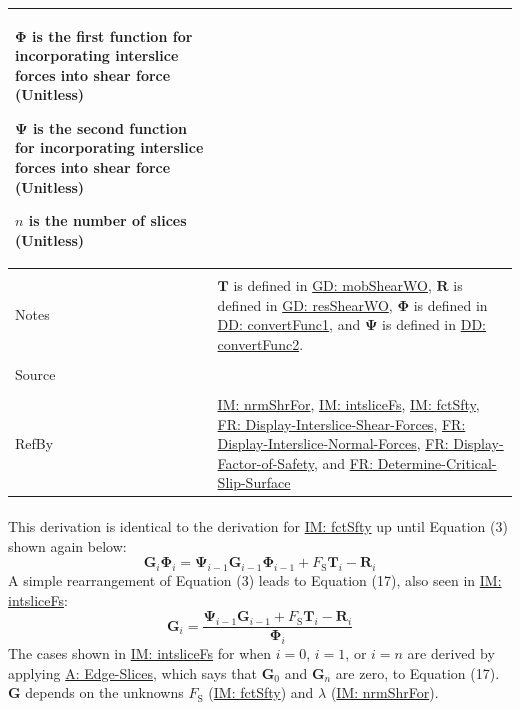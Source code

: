 \documentclass[12pt]{article}
\begin{document}
\begin{minipage}{\textwidth}
\begin{tabular}{>{\raggedright}p{}>{\raggedright\arraybackslash}p{}}
\begin{symbDescription}
              \item{$\mathbf{Φ}$ is the first function for incorporating interslice forces into shear force (Unitless)}
              \item{$\mathbf{Ψ}$ is the second function for incorporating interslice forces into shear force (Unitless)}
              \item{$n$ is the number of slices (Unitless)}
              \end{symbDescription}
\\ \midrule \\
Notes & $\mathbf{T}$ is defined in \hyperref[GD:mobShearWO]{GD: mobShearWO}, $\mathbf{R}$ is defined in \hyperref[GD:resShearWO]{GD: resShearWO}, $\mathbf{Φ}$ is defined in \hyperref[DD:convertFunc1]{DD: convertFunc1}, and $\mathbf{Ψ}$ is defined in \hyperref[DD:convertFunc2]{DD: convertFunc2}.
\\ \midrule \\
Source & \cite{chen2005}
\\ \midrule \\
RefBy & \hyperref[IM:nrmShrFor]{IM: nrmShrFor}, \hyperref[IM:intsliceFs]{IM: intsliceFs}, \hyperref[IM:fctSfty]{IM: fctSfty}, \hyperref[displayShear]{FR: Display-Interslice-Shear-Forces}, \hyperref[displayNormal]{FR: Display-Interslice-Normal-Forces}, \hyperref[displayFS]{FR: Display-Factor-of-Safety}, and \hyperref[determineCritSlip]{FR: Determine-Critical-Slip-Surface}
\\ \bottomrule
\end{tabular}
\end{minipage}
\paragraph{}
\label{IM:intsliceFsDeriv}
This derivation is identical to the derivation for \hyperref[IM:fctSfty]{IM: fctSfty} up until Equation (3) shown again below:
\begin{displaymath}
{\mathbf{G}}_{i} {\mathbf{Φ}}_{i}={\mathbf{Ψ}}_{i-1} {\mathbf{G}}_{i-1} {\mathbf{Φ}}_{i-1}+{F_{\text{S}}} {\mathbf{T}}_{i}-{\mathbf{R}}_{i}
\end{displaymath}
A simple rearrangement of Equation (3) leads to Equation (17), also seen in \hyperref[IM:intsliceFs]{IM: intsliceFs}:
\begin{displaymath}
{\mathbf{G}}_{i}=\frac{{\mathbf{Ψ}}_{i-1} {\mathbf{G}}_{i-1}+{F_{\text{S}}} {\mathbf{T}}_{i}-{\mathbf{R}}_{i}}{{\mathbf{Φ}}_{i}}
\end{displaymath}
The cases shown in \hyperref[IM:intsliceFs]{IM: intsliceFs} for when $i=0$, $i=1$, or $i=n$ are derived by applying \hyperref[assumpES]{A: Edge-Slices}, which says that ${\mathbf{G}}_{0}$ and ${\mathbf{G}}_{n}$ are zero, to Equation (17). $\mathbf{G}$ depends on the unknowns ${F_{\text{S}}}$ (\hyperref[IM:fctSfty]{IM: fctSfty}) and $λ$ (\hyperref[IM:nrmShrFor]{IM: nrmShrFor}).
\par~
\end{document}
